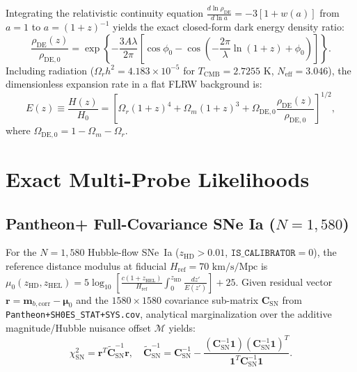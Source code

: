 \documentclass[10pt,twocolumn,a4paper]{article}
\begin{document}
Integrating the relativistic continuity equation $\frac{d\ln\rho_{\mathrm{DE}}}{d\ln a} = -3[1 + w(a)]$ from $a=1$ to $a=(1+z)^{-1}$ yields the exact closed-form dark energy density ratio:
\begin{equation}
\frac{\rho_{\mathrm{DE}}(z)}{\rho_{\mathrm{DE},0}} = \exp\!\left\{ -\frac{3 A \lambda}{2\pi} \left[ \cos\phi_0 - \cos\!\left(-\frac{2\pi}{\lambda}\ln(1+z) + \phi_0\right) \right] \right\}.
\label{eq:rho_exact}
\end{equation}
Including radiation ($\Omega_r h^2 = 4.183\times 10^{-5}$ for $T_{\mathrm{CMB}} = 2.7255\text{ K}$, $N_{\mathrm{eff}} = 3.046$), the dimensionless expansion rate in a flat FLRW background is:
\begin{equation}
E(z) \equiv \frac{H(z)}{H_0} = \left[ \Omega_r(1+z)^4 + \Omega_m(1+z)^3 + \Omega_{\mathrm{DE},0}\frac{\rho_{\mathrm{DE}}(z)}{\rho_{\mathrm{DE},0}} \right]^{1/2},
\label{eq:hubble}
\end{equation}
where $\Omega_{\mathrm{DE},0} = 1 - \Omega_m - \Omega_r$.

\section{Exact Multi-Probe Likelihoods}
\subsection{Pantheon+ Full-Covariance SNe Ia ($N = 1,580$)}
For the $N = 1,580$ Hubble-flow SNe~Ia ($z_{\mathrm{HD}} > 0.01$, $\texttt{IS\_CALIBRATOR} = 0$), the reference distance modulus at fiducial $H_{\mathrm{ref}} = 70\text{ km/s/Mpc}$ is $\mu_0(z_{\mathrm{HD}}, z_{\mathrm{HEL}}) = 5\log_{10}\!\left[\frac{c(1+z_{\mathrm{HEL}})}{H_{\mathrm{ref}}}\int_0^{z_{\mathrm{HD}}}\frac{dz'}{E(z')}\right] + 25$. Given residual vector $\mathbf{r} = \mathbf{m}_{b,\mathrm{corr}} - \boldsymbol{\mu}_0$ and the $1580\times 1580$ covariance sub-matrix $\mathbf{C}_{\mathrm{SN}}$ from \texttt{Pantheon+SH0ES\_STAT+SYS.cov}, analytical marginalization over the additive magnitude/Hubble nuisance offset $\mathcal{M}$ yields:
\begin{equation}
\chi^2_{\mathrm{SN}} = \mathbf{r}^T \tilde{\mathbf{C}}_{\mathrm{SN}}^{-1} \mathbf{r}, \quad \tilde{\mathbf{C}}_{\mathrm{SN}}^{-1} = \mathbf{C}_{\mathrm{SN}}^{-1} - \frac{(\mathbf{C}_{\mathrm{SN}}^{-1}\mathbf{1})(\mathbf{C}_{\mathrm{SN}}^{-1}\mathbf{1})^T}{\mathbf{1}^T \mathbf{C}_{\mathrm{SN}}^{-1}\mathbf{1}}.
\label{eq:chi2_sn}
\end{equation}
\end{document}
